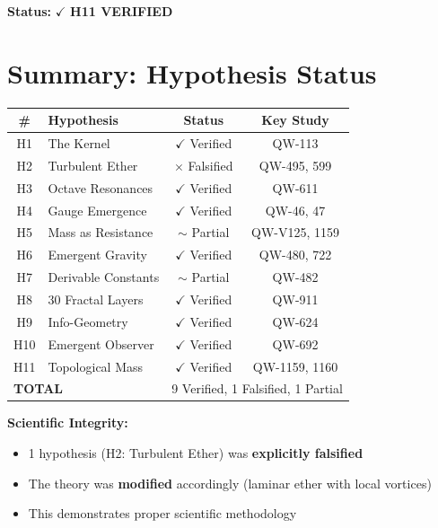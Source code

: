 \documentclass[11pt,a4paper]{book}
\theoremstyle{remark}
\begin{document}
\textbf{Status:} $\checkmark$ \textbf{H11 VERIFIED}

\section{Summary: Hypothesis Status}

\begin{center}
\begin{tabular}{|c|l|c|c|}
\hline
\textbf{\#} & \textbf{Hypothesis} & \textbf{Status} & \textbf{Key Study} \\
\hline
H1 & The Kernel & $\checkmark$ Verified & QW-113 \\
H2 & Turbulent Ether & $\times$ Falsified & QW-495, 599 \\
H3 & Octave Resonances & $\checkmark$ Verified & QW-611 \\
H4 & Gauge Emergence & $\checkmark$ Verified & QW-46, 47 \\
H5 & Mass as Resistance & $\sim$ Partial & QW-V125, 1159 \\
H6 & Emergent Gravity & $\checkmark$ Verified & QW-480, 722 \\
H7 & Derivable Constants & $\sim$ Partial & QW-482 \\
H8 & 30 Fractal Layers & $\checkmark$ Verified & QW-911 \\
H9 & Info-Geometry & $\checkmark$ Verified & QW-624 \\
H10 & Emergent Observer & $\checkmark$ Verified & QW-692 \\
H11 & Topological Mass & $\checkmark$ Verified & QW-1159, 1160 \\
\hline
\multicolumn{2}{|l|}{\textbf{TOTAL}} & \multicolumn{2}{c|}{9 Verified, 1 Falsified, 1 Partial} \\
\hline
\end{tabular}
\end{center}

\textbf{Scientific Integrity:}
\begin{itemize}
    \item 1 hypothesis (H2: Turbulent Ether) was \textbf{explicitly falsified}
    \item The theory was \textbf{modified} accordingly (laminar ether with local vortices)
    \item This demonstrates proper scientific methodology
\end{itemize}

\end{document}
